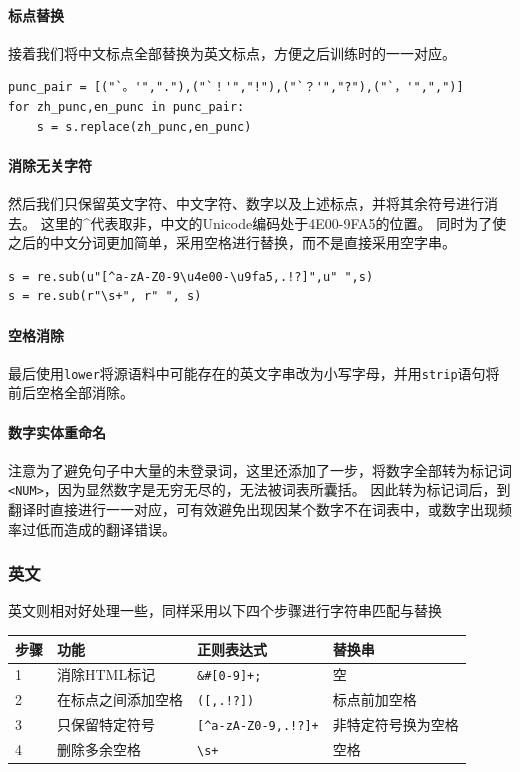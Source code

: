 \documentclass[logo,reportComp]{thesis}
\begin{document}
\paragraph{标点替换}
接着我们将中文标点全部替换为英文标点，方便之后训练时的一一对应。
\begin{lstlisting}
punc_pair = [("`。'","."),("`！'","!"),("`？'","?"),("`，'",",")]
for zh_punc,en_punc in punc_pair:
    s = s.replace(zh_punc,en_punc)
\end{lstlisting}

\paragraph{消除无关字符}
然后我们只保留英文字符、中文字符、数字以及上述标点，并将其余符号进行消去。
这里的\^{}代表取非，中文的Unicode编码处于4E00-9FA5的位置\cite{bib:unicode}。
同时为了使之后的中文分词更加简单，采用空格进行替换，而不是直接采用空字串。
\begin{lstlisting}
s = re.sub(u"[^a-zA-Z0-9\u4e00-\u9fa5,.!?]",u" ",s)
s = re.sub(r"\s+", r" ", s)
\end{lstlisting}

\paragraph{空格消除}
最后使用\verb'lower'将源语料中可能存在的英文字串改为小写字母，并用\verb'strip'语句将前后空格全部消除。

\paragraph{数字实体重命名}
注意为了避免句子中大量的未登录词，这里还添加了一步，将数字全部转为标记词\verb'<NUM>'，因为显然数字是无穷无尽的，无法被词表所囊括。
因此转为标记词后，到翻译时直接进行一一对应，可有效避免出现因某个数字不在词表中，或数字出现频率过低而造成的翻译错误。

\subsubsection{英文}
英文则相对好处理一些，同样采用以下四个步骤进行字符串匹配与替换
\begin{table}[H]
\centering
\begin{tabular}{|l|l|l|l|}\hline
步骤 & 功能 & 正则表达式 & 替换串 \\\hline
1 & 消除HTML标记 & \verb'&#[0-9]+;' & 空\\\hline
2 & 在标点之间添加空格 & \verb'([,.!?])' & 标点前加空格\\\hline
3 & 只保留特定符号 & \verb'[^a-zA-Z0-9,.!?]+' & 非特定符号换为空格\\\hline
4 & 删除多余空格 & \verb'\s+' & 空格\\\hline
\end{tabular}
\end{table}
\end{document}
